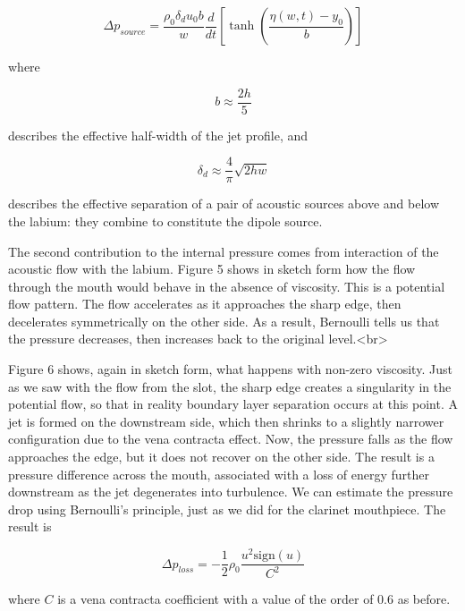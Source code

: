  $$\Delta p_{source}=\dfrac{\rho_0 \delta_d u_0 b}{w} \dfrac{d}{dt} \left[ 
  \tanh \left( \dfrac{\eta(w,t)-y_0}{b} \right) \right] \tag{6}$$ 

  where 

  $$b \approx \dfrac{2h}{5} \tag{7}$$ 

  describes the effective half-width of the jet profile, and 

  $$\delta_d \approx \dfrac{4}{\pi}\sqrt{2 h w} \tag{8}$$ 

  describes the effective separation of a pair of acoustic sources above and 
  below the labium: they combine to constitute the dipole source. 

  The second contribution to the internal pressure comes from interaction of 
  the acoustic flow with the labium. Figure 5 shows in sketch form how the flow 
  through the mouth would behave in the absence of viscosity. This is a 
  potential flow pattern. The flow accelerates as it approaches the sharp edge, 
  then decelerates symmetrically on the other side. As a result, Bernoulli 
  tells us that the pressure decreases, then increases back to the original 
  level.<br> 


  Figure 6 shows, again in sketch form, what happens with non-zero viscosity. 
  Just as we saw with the flow from the slot, the sharp edge creates a 
  singularity in the potential flow, so that in reality boundary layer 
  separation occurs at this point. A jet is formed on the downstream side, 
  which then shrinks to a slightly narrower configuration due to the vena 
  contracta effect. Now, the pressure falls as the flow approaches the edge, 
  but it does not recover on the other side. The result is a pressure 
  difference across the mouth, associated with a loss of energy further 
  downstream as the jet degenerates into turbulence. We can estimate the 
  pressure drop using Bernoulli's principle, just as we did for the clarinet 
  mouthpiece. The result is 

  $$\Delta p_{loss} = -\dfrac{1}{2} \rho_0 \dfrac{u^2 \mathrm{sign}(u)}{C^2} 
  \tag{9}$$ 

  where $C$ is a vena contracta coefficient with a value of the order of 0.6 as 
  before. 


